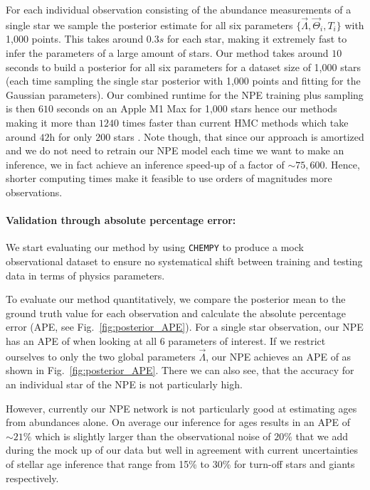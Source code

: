 \documentclass{aa}
\begin{document}
For each individual observation consisting of the abundance measurements of a single star we sample the posterior estimate for all six parameters $\{\vec\Lambda,\vec\Theta_i,T_i\}$ with 1,000 points. This takes around $0.3s$ for each star, making it extremely fast to infer the parameters of a large amount of stars. Our method takes around $10$ seconds to build a posterior for all six parameters for a dataset size of 1,000 stars (each time sampling the single star posterior with 1,000 points and fitting for the Gaussian parameters). Our combined runtime for the NPE training plus sampling is then $610$ seconds on an Apple M1 Max for 1,000 stars hence our methods making it more than $1240$ times faster than current HMC methods which take around $42$h for only $200$ stars \citep{Philcox_2019}. Note though, that since our approach is amortized and we do not need to retrain our NPE model each time we want to make an inference, we in fact achieve an inference speed-up of a factor of $\sim75,600$.
Hence, shorter computing times make it feasible to use orders of magnitudes more observations.

\paragraph{Validation through absolute percentage error:}
We start evaluating our method by using \texttt{CHEMPY} to produce a mock observational dataset to ensure no systematical shift between training and testing data in terms of physics parameters.

To evaluate our method quantitatively, we compare the posterior mean to the ground truth value for each observation and calculate the absolute percentage error (APE, see Fig.~\ref{fig:posterior_APE}). For a single star observation, our NPE has an APE of  when looking at all 6 parameters of interest.
If we restrict ourselves to only the two global parameters $\vec\Lambda$, our NPE achieves an APE of  as shown in Fig.~\ref{fig:posterior_APE}. There we can also see, that the accuracy for an individual star of the NPE is not particularly high. 

However, currently our NPE network is not particularly good at estimating ages from abundances alone. On average our inference for ages results in an APE of $\sim21\%$ which is slightly larger than the observational noise of $20\%$ that we add during the mock up of our data but well in agreement with current uncertainties of stellar age inference that range from 15\% to 30\% for turn-off stars and giants respectively.
\end{document}
